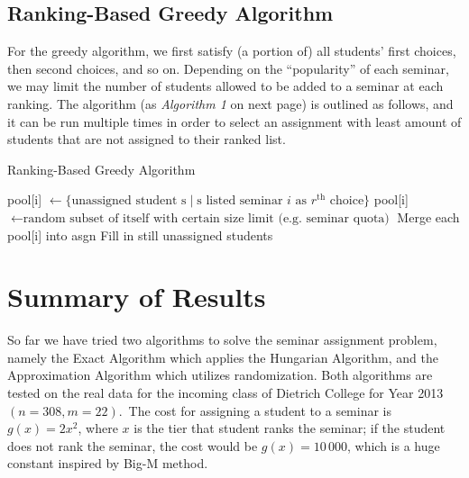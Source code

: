 \documentclass{article} %
\begin{document}
\subsection{Ranking-Based Greedy Algorithm}
    \par For the greedy algorithm, we first satisfy (a portion of) all students' first choices, then second choices, and so on. Depending on the ``popularity'' of each seminar, we may limit the number of students allowed to be added to a seminar at each ranking. The algorithm (as \emph{Algorithm 1} on next page) is outlined as follows, and it can be run multiple times in order to select an assignment with least amount of students that are not assigned to their ranked list.
    \begin{algorithm}
        \caption{Ranking-Based Greedy Algorithm}
        \begin{algorithmic}
                    \State pool[i] $\gets \{\text{unassigned student s} \mid \text{s listed seminar $i$ as $r^\text{th}$ choice}\}$
                    \State pool[i] $\gets \text{random subset of itself with certain size limit (e.g. seminar quota)}$
                \EndFor
                \State Merge each pool[i] into asgn
            \EndFor
            \State Fill in still unassigned students
        \end{algorithmic}
    \end{algorithm}

%
%
\section{Summary of Results}
    \par\qquad So far we have tried two algorithms to solve the seminar assignment problem, namely the Exact Algorithm which applies the Hungarian Algorithm, and the Approximation Algorithm which utilizes randomization. Both algorithms are tested on the real data for the incoming class of Dietrich College for Year 2013 $(n=308, m=22)$. The cost for assigning a student to a seminar is $g(x)=2x^2$, where $x$ is the tier that student ranks the seminar; if the student does not rank the seminar, the cost would be $g(x)=10\,000$, which is a huge constant inspired by Big-M method.
\end{document}

